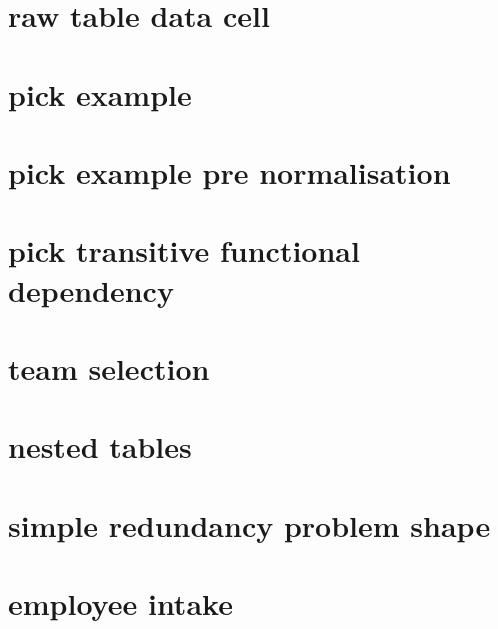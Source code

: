 \documentclass[10pt,a4paper]{article}
\begin{document}
\section{raw table data cell}



\section{pick example}


\section{pick example pre normalisation}


\section{pick transitive functional dependency}


\section{team selection}


\iffalse
\needspace{20\baselineskip}
\section{nested rows}

\fi

\section{nested tables}


\section{simple redundancy problem shape}


\section{employee intake}

\end{document}
